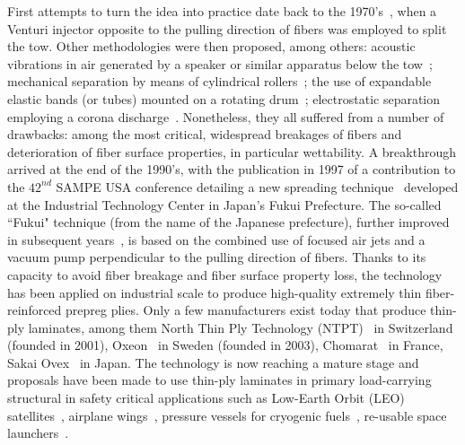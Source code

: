 First attempts to turn the idea into practice date back to the 1970's~\cite{spreadtowpatent:1974}, when a Venturi injector opposite to the pulling direction of fibers was employed to split the tow. Other methodologies were then proposed, among others: acoustic vibrations in air generated by a speaker or similar apparatus below the tow~\cite{spreadtowpatent:1991}; mechanical separation by means of cylindrical rollers~\cite{spreadtowpatent:1992}; the use of expandable elastic bands (or tubes) mounted on a rotating drum~\cite{spreadtowpatent:2000}; electrostatic separation employing a corona discharge~\cite{spreadtowpatent:1993}. Nonetheless, they all suffered from a number of drawbacks: among the most critical, widespread breakages of fibers and deterioration of fiber surface properties, in particular wettability. A breakthrough arrived at the end of the 1990's, with the publication in 1997 of a contribution to the $42^{nd}$ SAMPE USA conference detailing a new spreading technique~\cite{Intro:KawabeTomodaMatsuo:1997} developed at the Industrial Technology Center in Japan's Fukui Prefecture. The so-called ``Fukui" technique (from the name of the Japanese prefecture), further improved in subsequent years~\cite{spreadtowpatent:2003,Intro:Kawabe:2008,Intro:SasayamaTomoda:2009}, is based on the combined use of focused air jets and a vacuum pump perpendicular to the pulling direction of fibers. Thanks to its capacity to avoid fiber breakage and fiber surface property loss, the technology has been applied on industrial scale to produce high-quality extremely thin fiber-reinforced prepreg plies. Only a few manufacturers exist today that produce thin-ply laminates, among them North Thin Ply Technology (NTPT)~\cite{ntpt} in Switzerland (founded in 2001), Oxeon~\cite{oxeon} in Sweden (founded in 2003), Chomarat~\cite{chomarat} in France, Sakai Ovex~\cite{sakai} in Japan. The technology is now reaching a mature stage and proposals have been made to use thin-ply laminates in primary load-carrying structural in safety critical applications such as Low-Earth Orbit (LEO) satellites~\cite{Moon2011}, airplane wings~\cite{Kim2017}, pressure vessels for cryogenic fuels~\cite{McCarville2018}, re-usable space launchers~\cite{Kopp2017}.\\

